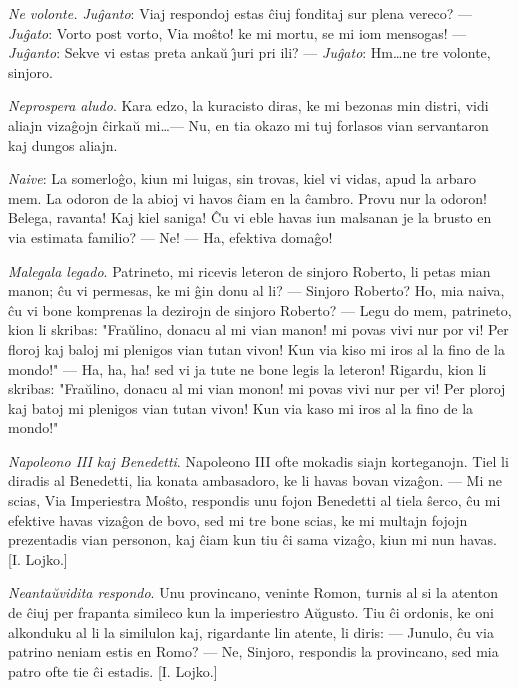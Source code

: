 \emph{Ne volonte. Ju\^ganto}: Viaj respondoj estas \^ciuj fonditaj
sur plena vereco? --- {\sl Ju\^gato}: Vorto post vorto, Via mo\^sto!
ke mi mortu, se mi iom mensogas! --- {\sl Ju\^ganto}: Sekve vi estas
preta anka\u u \^{\j}uri pri ili? --- {\sl Ju\^gato}: Hm\dots ne tre
volonte, sinjoro.

\emph{Neprospera aludo}. Kara edzo, la kuracisto diras, ke mi
bezonas min distri, vidi aliajn viza\^gojn \^cirka\u u mi\dots ---
Nu, en tia okazo mi tuj forlasos vian servantaron kaj dungos aliajn.

\emph{Naive}: La somerlo\^go, kiun mi luigas, sin trovas, kiel vi
vidas, apud la arbaro mem. La odoron de la abioj vi havos \^ciam en
la \^cambro. Provu nur la odoron! Belega, ravanta! Kaj kiel saniga!
\^Cu vi eble havas iun malsanan je la brusto en via estimata
familio? --- Ne! --- Ha, efektiva doma\^go!

\emph{Malegala legado}. Patrineto, mi ricevis leteron de sinjoro
Roberto, li petas mian manon; \^cu vi permesas, ke mi \^gin donu al
li? --- Sinjoro Roberto? Ho, mia naiva, \^cu vi bone komprenas la
dezirojn de sinjoro Roberto? --- Legu do mem, patrineto, kion li
skribas: "Fra\u ulino, donacu al mi vian manon! mi povas vivi nur
por vi! Per floroj kaj baloj mi plenigos vian tutan vivon! Kun via
kiso mi iros al la fino de la mondo!" --- Ha, ha, ha! sed vi ja
tute ne bone legis la leteron! Rigardu, kion li skribas: "Fra\u
ulino, donacu al mi vian monon! mi povas vivi nur per vi! Per ploroj
kaj batoj mi plenigos vian tutan vivon! Kun via kaso mi iros al la
fino de la mondo!"

\emph{Napoleono III kaj Benedetti}. Napoleono III ofte mokadis siajn
kor\-te\-ga\-nojn. Tiel li diradis al Benedetti, lia konata
ambasadoro, ke li havas bovan viza\^gon. --- Mi ne scias, Via
Imperiestra Mo\^sto, respondis unu fojon Benedetti al tiela \^serco,
\^cu mi efektive havas viza\^gon de bovo, sed mi tre bone scias, ke
mi multajn fojojn prezentadis vian personon, kaj \^ciam kun tiu \^ci
sama viza\^go, kiun mi nun havas. [I. Lojko.]

\emph{Neanta\u uvidita respondo}. Unu provincano, veninte Romon,
turnis al si la atenton de \^ciuj per frapanta simileco kun la
imperiestro A\u ugusto. Tiu \^ci ordonis, ke oni alkonduku al li la
similulon kaj, rigardante lin atente, li diris: --- Junulo, \^cu via
patrino neniam estis en Romo? --- Ne, Sinjoro, respondis la
provincano, sed mia patro ofte tie \^ci estadis. [I. Lojko.]


